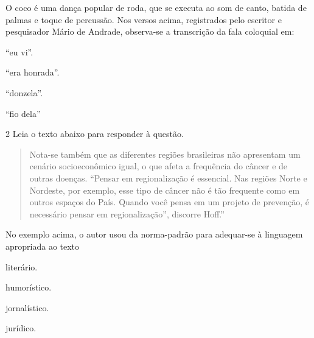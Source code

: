 
O coco é uma dança popular de roda, que se executa ao som de canto, batida de palmas e 
toque de percussão. Nos versos acima, registrados pelo escritor e pesquisador Mário de 
Andrade, observa-se a transcrição da fala coloquial em:

\begin{escolha}
  
  \item ``eu vi''.
  
  \item ``era honrada''.
  
  \item ``donzela''.
  
  \item ``fio dela''

\end{escolha}


\num{2} Leia o texto abaixo para responder à questão.

\begin{quote}
Nota-se também que as diferentes regiões brasileiras não apresentam um
cenário socioeconômico igual, o que afeta a frequência do câncer e de
outras doenças. ``Pensar em regionalização é essencial. Nas regiões Norte
e Nordeste, por exemplo, esse tipo de câncer não é tão frequente como em
outros espaços do País. Quando você pensa em um projeto de prevenção, é
necessário pensar em regionalização'', discorre Hoff.''
\end{quote}


No exemplo acima, o autor usou da norma-padrão para adequar-se à linguagem apropriada ao texto

\begin{escolha}
  
  \item literário.
  
  \item humorístico.
  
  \item jornalístico.
  
  \item jurídico.

\end{escolha}


